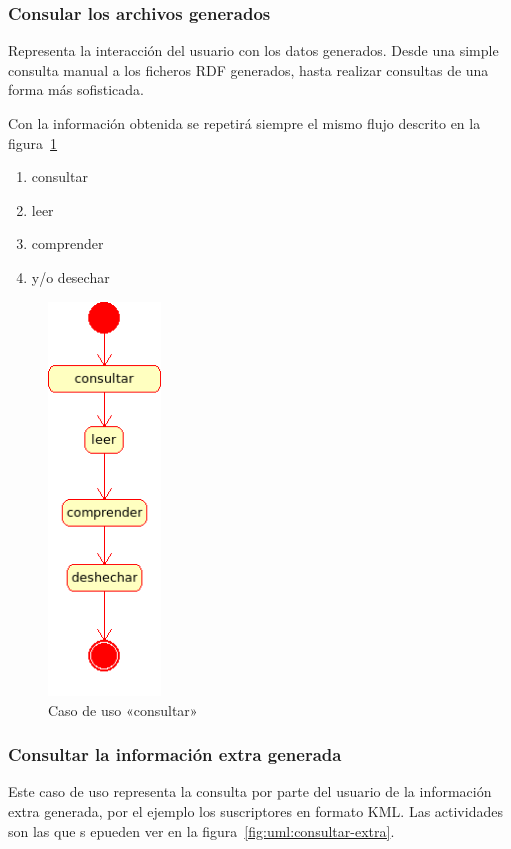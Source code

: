 \subsubsection{Consular los archivos generados}

Representa la interacción del usuario con los datos generados. Desde una 
simple consulta manual a los ficheros RDF generados, hasta realizar 
consultas de una forma más sofisticada.

Con la información obtenida se repetirá siempre el mismo flujo descrito en
la figura~\ref{fig:uml:consultar}

\begin{enumerate}
 \item consultar
 \item leer
 \item comprender
 \item y/o desechar
\end{enumerate}

\begin{figure}[ht]
 	\centering
	\includegraphics[width=3cm]{images/uml/casos-uso/consultar.png}
	\caption{Caso de uso «consultar»}
	\label{fig:uml:consultar}
\end{figure}

\subsubsection{Consultar la información extra generada}

Este caso de uso representa la consulta por parte del usuario de la 
información extra generada, por el ejemplo los suscriptores en formato 
KML. Las actividades son las que s epueden ver en la 
figura~\ref{fig:uml:consultar-extra}.

